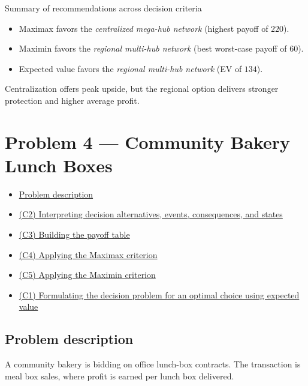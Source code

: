 \documentclass[11pt]{article}
\begin{document}
	Summary of recommendations across decision criteria
	\begin{itemize}
		\item Maximax favors the \emph{centralized mega-hub network} (highest payoff of $220$).
		\item Maximin favors the \emph{regional multi-hub network} (best worst-case payoff of $60$).
		\item Expected value favors the \emph{regional multi-hub network} (EV of $134$).
	\end{itemize}
	
	Centralization offers peak upside, but the regional option delivers stronger protection and higher average profit.
	
	\section*{Problem 4 — Community Bakery Lunch Boxes}
	
	\hypertarget{problem4}{}
	
	\hypertarget{problem4-criteria}{}
	
	
	\begin{itemize}
		\item \hyperlink{problem4-problem}{Problem description}
		\item \hyperlink{problem4-c2}{(C2) Interpreting decision alternatives, events, consequences, and states}
		\item \hyperlink{problem4-c3}{(C3) Building the payoff table}
		\item \hyperlink{problem4-c4}{(C4) Applying the Maximax criterion}
		\item \hyperlink{problem4-c5}{(C5) Applying the Maximin criterion}
		\item \hyperlink{problem4-c1}{(C1) Formulating the decision problem for an optimal choice using expected value}
	\end{itemize}
	
	
	\subsection*{Problem description}
	
	\hypertarget{problem4-problem}{}
	
	A community bakery is bidding on office lunch-box contracts. The transaction is meal box sales, where profit is earned
	per lunch box delivered.
	
	
	
	
	
\end{document}
